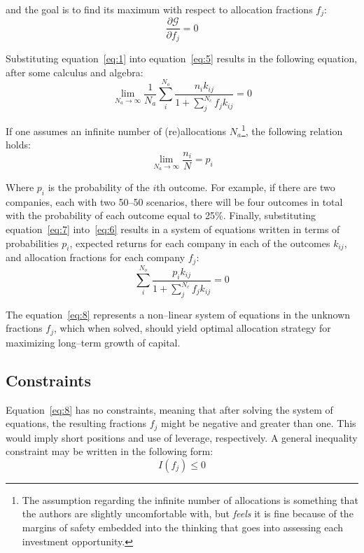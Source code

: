 \documentclass{article}
\begin{document}
\noindent and the goal is to find its maximum with respect to allocation
fractions $f_j$:
\begin{equation}
\label{eq:5}
    \frac{\partial \mathcal{G}}{\partial f_j} = 0
\end{equation}

\noindent Substituting equation~\eqref{eq:1} into equation~\eqref{eq:5} results
in the following equation, after some calculus and algebra:
\begin{equation}
\label{eq:6}
    \lim_{N_a \to \infty} \frac{1}{N_a}
    \sum_{i}^{N_o} \frac{n_i k_{ij}}{1 + \sum_{j}^{N_c} f_j k_{ij}} = 0
\end{equation}

\noindent If one assumes an infinite number of (re)allocations
$N_a$\footnote{The assumption regarding the infinite number of allocations is
something that the authors are slightly uncomfortable with, but \textit{feels}
it is fine because of the margins of safety embedded into the thinking that goes
into assessing each investment opportunity.}, the following relation holds:
\begin{equation}
\label{eq:7}
    \lim_{N_a \to \infty} \frac{n_i}{N} = p_i
\end{equation}

\noindent Where $p_i$ is the probability of the $i$th outcome. For example, if
there are two companies, each with two 50--50 scenarios, there will be four
outcomes in total with the probability of each outcome equal to 25\%. Finally,
substituting equation~\eqref{eq:7} into~\eqref{eq:6} results in a system of
equations written in terms of probabilities $p_i$, expected returns for each
company in each of the outcomes $k_{ij}$, and allocation fractions for each
company $f_j$:
\begin{equation}
\label{eq:8}
    \sum_{i}^{N_o} \frac{p_i k_{ij}}{1 + \sum_{j}^{N_c} f_j k_{ij}} = 0
\end{equation}

\noindent The equation~\eqref{eq:8} represents a non--linear system of equations
in the unknown fractions $f_j$, which when solved, should yield optimal
allocation strategy for maximizing long--term growth of capital.

\subsection{Constraints}
\label{sec:constraints}

\noindent Equation~\eqref{eq:8} has no constraints, meaning that after solving
the system of equations, the resulting fractions $f_j$ might be negative and
greater than one. This would imply short positions and use of leverage,
respectively. A general inequality constraint may be written in the following
form:
\begin{equation}
\label{eq:9}
    I(f_j) \le 0
\end{equation}
\end{document}
